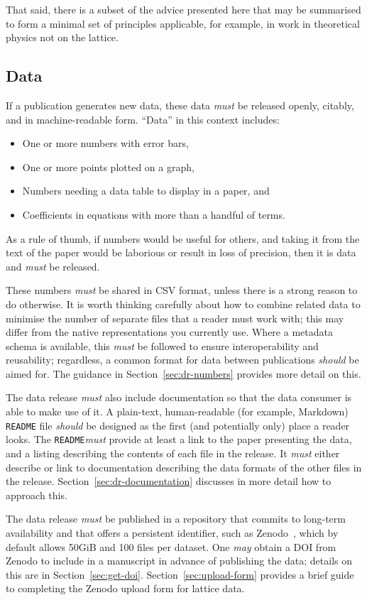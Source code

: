 \documentclass{article}
\newcommand\rfcword[1]{\emph{#1}\xspace}
\newcommand\must{\rfcword{must}}
\newcommand\should{\rfcword{should}}
\newcommand\may{\rfcword{may}}
\newcommand\filename[1]{\texttt{#1}\xspace}
\newcommand\readme{\filename{README}}
\begin{document}
That said,
there is a subset of the advice presented here that may be summarised
to form a minimal set of principles applicable,
for example,
in work in theoretical physics not on the lattice.

\subsection{Data}

If a publication generates new data,
these data \must be released openly, citably, and in machine-readable form.
``Data'' in this context includes:
\begin{itemize}
  \item One or more numbers with error bars,
  \item One or more points plotted on a graph,
  \item Numbers needing a data table to display in a paper, and
  \item Coefficients in equations with more than a handful of terms.
\end{itemize}
As a rule of thumb,
if numbers would be useful for others,
and taking it from the text of the paper would be laborious
or result in loss of precision,
then it is data and \must be released.

These numbers \must be shared in CSV format,
unless there is a strong reason to do otherwise.
It is worth thinking carefully about how to combine related data
to minimise the number of separate files that a reader must work with;
this may differ from the native representations you currently use.
Where a metadata schema is available,
this \must be followed to ensure interoperability and reusability;
regardless,
a common format for data between publications \should be aimed for.
The guidance in Section~\ref{sec:dr-numbers} provides more detail on this.

The data release \must also include documentation
so that the data consumer is able to make use of it.
A plain-text, human-readable
(for example, Markdown)
\readme file \should be designed as the first
(and potentially only)
place a reader looks.
The \readme \must provide at least a link to the paper presenting the data,
and a listing describing the contents of each file in the release.
It \must either describe or link to documentation describing
the data formats of the other files in the release.
Section~\ref{sec:dr-documentation} discusses in more detail how to approach this.

The data release \must be published in a repository that commits to long-term availability
and that offers a persistent identifier,
such as Zenodo~\cite{zenodo},
which by default allows 50GiB and 100 files per dataset.
One \may obtain a DOI from Zenodo to include in a manuscript
in advance of publishing the data;
details on this are in Section~\ref{sec:get-doi}.
Section~\ref{sec:upload-form} provides
a brief guide to completing the Zenodo upload form for lattice data.
\end{document}
